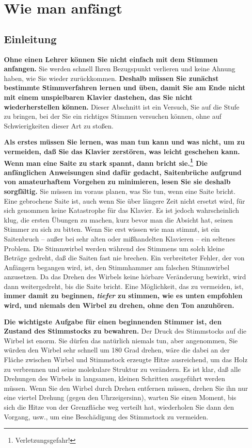 
\section{Wie man anfängt}
\label{c2_5}

\subsection{Einleitung}
\label{c2_5a}

\textbf{Ohne einen Lehrer können Sie nicht einfach mit dem Stimmen anfangen.}
Sie werden schnell Ihren Bezugspunkt verlieren und keine Ahnung haben, wie Sie wieder zurückkommen.
\textbf{Deshalb müssen Sie zunächst bestimmte Stimmverfahren lernen und üben, damit Sie am Ende nicht mit einem unspielbaren Klavier dastehen, das Sie nicht wiederherstellen können.}
Dieser Abschnitt ist ein Versuch, Sie auf die Stufe zu bringen, bei der Sie ein richtiges Stimmen versuchen können, ohne auf Schwierigkeiten dieser Art zu stoßen.

\textbf{Als erstes müssen Sie lernen, was man tun kann und was nicht, um zu vermeiden, daß Sie das Klavier zerstören, was leicht geschehen kann.
Wenn man eine Saite zu stark spannt, dann bricht sie.\footnote{Verletzungsgefahr!}
Die anfänglichen Anweisungen sind dafür gedacht, Saitenbrüche aufgrund von amateurhaftem Vorgehen zu minimieren, lesen Sie sie deshalb sorgfältig.}
Sie müssen im voraus planen, was Sie tun, wenn eine Saite bricht.
Eine gebrochene Saite ist, auch wenn Sie über längere Zeit nicht ersetzt wird, für sich genommen keine Katastrophe für das Klavier.
Es ist jedoch wahrscheinlich klug, die ersten Übungen zu machen, kurz bevor man die Absicht hat, seinen Stimmer zu sich zu bitten.
Wenn Sie erst wissen wie man stimmt, ist ein Saitenbruch -- außer bei sehr alten oder mißhandelten Klavieren --  ein seltenes Problem.
Die Stimmwirbel werden während des Stimmens um solch kleine Beträge gedreht, daß die Saiten fast nie brechen.
Ein verbreiteter Fehler, der von Anfängern begangen wird, ist, den Stimmhammer am falschen Stimmwirbel anzusetzen.
Da das Drehen des Wirbels keine hörbare Veränderung bewirkt, wird dann weitergedreht, bis die Saite bricht.
Eine Möglichkeit, das zu vermeiden, ist, \textbf{immer damit zu beginnen, \textit{tiefer} zu stimmen, wie es unten empfohlen wird, und niemals den Wirbel zu drehen, ohne den Ton anzuhören.}

\textbf{Die wichtigste Aufgabe für einen beginnenden Stimmer ist, den Zustand des Stimmstocks zu bewahren.}
Der Druck des Stimmstocks auf die Wirbel ist enorm.
Sie dürfen das natürlich niemals tun, aber angenommen, Sie würden den Wirbel sehr schnell um 180 Grad drehen, wäre die dabei an der Fläche zwischen Wirbel und Stimmstock erzeugte Hitze ausreichend, um das Holz zu verbrennen und seine molekulare Struktur zu verändern.
Es ist klar, daß alle Drehungen des Wirbels in langsamen, kleinen Schritten ausgeführt werden müssen.
Wenn Sie den Wirbel durch Drehen entfernen müssen, drehen Sie ihn nur eine viertel Drehung (gegen den Uhrzeigersinn), warten Sie einen Moment, bis sich die Hitze von der Grenzfläche weg verteilt hat, wiederholen Sie dann den Vorgang, usw., um eine Beschädigung des Stimmstock zu vermeiden.

